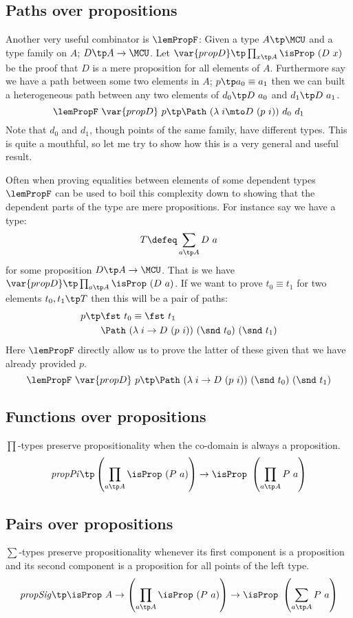 \subsection{Paths over propositions}
\label{sec:lemPropF}
Another very useful combinator is $\lemPropF$: Given a type $A \tp
\MCU$ and a type family on $A$; $D \tp A \to \MCU$. Let $\var{propD}
\tp \prod_{x \tp A} \isProp\ (D\ x)$ be the proof that $D$ is a mere
proposition for all elements of $A$. Furthermore say we have a path
between some two elements in $A$; $p \tp a_0 \equiv a_1$ then we can
built a heterogeneous path between any two elements of $d_0 \tp
D\ a_0$ and $d_1 \tp D\ a_1$.
%
$$
\lemPropF\ \var{propD}\ p \tp \Path\ (\lambda\; i \mto D\ (p\ i))\ d_0\ d_1
$$
%
Note that $d_0$ and $d_1$, though points of the same family, have
different types. This is quite a mouthful, so let me try to show how
this is a very general and useful result.

Often when proving equalities between elements of some dependent types
$\lemPropF$ can be used to boil this complexity down to showing that
the dependent parts of the type are mere propositions. For instance
say we have a type:
%
$$
T \defeq \sum_{a \tp A} D\ a
$$
%
for some proposition $D \tp A \to \MCU$. That is we have $\var{propD}
\tp \prod_{a \tp A} \isProp\ (D\ a)$. If we want to prove $t_0 \equiv
t_1$ for two elements $t_0, t_1 \tp T$ then this will be a pair of
paths:
%
%
\begin{align*}
  p \tp & \fst\ t_0 \equiv \fst\ t_1 \\
        & \Path\ (\lambda\; i \to D\ (p\ i))\ (\snd\ t_0)\ (\snd\ t_1)
\end{align*}
%
Here $\lemPropF$ directly allow us to prove the latter of these given
that we have already provided $p$.
%
$$
\lemPropF\ \var{propD}\ p
  \tp \Path\ (\lambda\; i \to D\ (p\ i))\ (\snd\ t_0)\ (\snd\ t_1)
$$
%
\subsection{Functions over propositions}
\label{sec:propPi}%
$\prod$-types preserve propositionality when the co-domain is always a
proposition.
%
$$
\mathit{propPi} \tp \left(\prod_{a \tp A} \isProp\ (P\ a)\right) \to \isProp\ \left(\prod_{a \tp A} P\ a\right)
$$
\subsection{Pairs over propositions}
\label{sec:propSig}
%
$\sum$-types preserve propositionality whenever its first component is
a proposition and its second component is a proposition for all
points of the left type.
%
$$
\mathit{propSig} \tp \isProp\ A \to \left(\prod_{a \tp A} \isProp\ (P\ a)\right) \to \isProp\ \left(\sum_{a \tp A} P\ a\right)
$$

